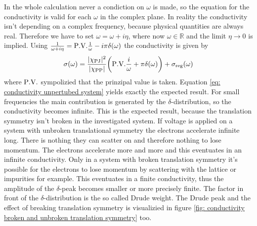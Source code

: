 In the whole calculation never a condiction on $\omega$ is made, so the equation for the conductivity is valid for each $\omega$ in the complex plane.
In reality the conductivity isn't depending on a complex frequency, because physical quantities are always real.
Therefore we have to set $\omega = \omega + i \eta$, where now $\omega \in \mathbb{R}$ and the limit $\eta \to 0$ is implied.
Using $\frac{1}{\omega + i\eta} = \PV{\frac{1}{\omega}} - i\pi\delta(\omega)$ the conductivity is given by
%
\begin{align}
	\sigma(\omega) = \frac{\vert\chi_{\mt{PJ}}\vert^{2}}{\vert\chi_{\mt{PP}}\vert} \bigg(\PV{\frac{i}{\omega}} + \pi \delta(\omega) \bigg) + \sigma_{\mt{reg}}(\omega)
	\label{eq: conductivity unpertubed system}
\end{align}
%
where $\PV$ sympolizied that the prinzipal value is taken.
Equation \eqref{eq: conductivity unpertubed system} yields exactly the expected result.
For small frequencies the main contribution is generated by the $\delta$-distribution, so the conductivity becomes infinite.
This is the expected result, because the translation symmetry isn't broken in the investigated system.
If voltage is applied on a system with unbroken translational symmetry the electrons accelerate infinite long.
There is nothing they can scatter on and therefore nothing to lose momentum.
The electrons accelerate more and more and this eventuates in an infinite conductivity.
Only in a system with broken translation symmetry it's possible for the electrons to lose momentum by scattering with the lattice or impurities for example.
This eventuates in a finite conductivity, thus the amplitude of the $\delta$-peak becomes smaller or more precisely finite.
The factor in front of the $\delta$-distribution is the so called Drude weight.
The Drude peak and the effect of breaking translation symmetry is visualizied in figure \ref{fig: conductivity broken and unbroken translation symmetry} too.
%
%
